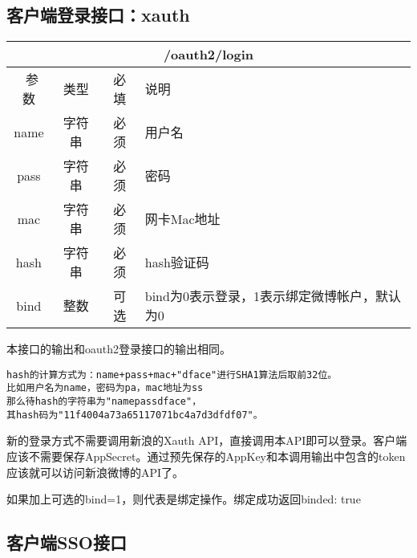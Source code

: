 \documentclass[cs4size]{ctexartutf8}
\begin{document}
\subsection{客户端登录接口：xauth}
\label{hash_algorithm}

\begin{table}[H]
   \begin{center}
\begin{tabular}{|c|c|c|p{12cm}|}
\hline
\multicolumn{4}{|c|}{/oauth2/login} \\
\hline\hline
 \  参数  & 类型 & 必填 &  说明  \\
\hline
 name  & 字符串 & 必须 &  用户名\\
 \hline
 pass  & 字符串 & 必须 &  密码\\
  \hline
 mac  & 字符串 & 必须 &  网卡Mac地址\\
 \hline
 hash  & 字符串 & 必须 &  hash验证码\\
\hline
 bind  & 整数 & 可选 &  bind为0表示登录，1表示绑定微博帐户，默认为0\\
\hline
\end{tabular}
   \end{center}
\end{table}

本接口的输出和oauth2登录接口的输出相同。

\begin{verbatim}
hash的计算方式为：name+pass+mac+"dface"进行SHA1算法后取前32位。
比如用户名为name，密码为pa，mac地址为ss
那么待hash的字符串为"namepassdface"，
其hash码为"11f4004a73a65117071bc4a7d3dfdf07"。
\end{verbatim}

新的登录方式不需要调用新浪的Xauth API，直接调用本API即可以登录。客户端应该不需要保存AppSecret。通过预先保存的AppKey和本调用输出中包含的token应该就可以访问新浪微博的API了。

如果加上可选的bind=1，则代表是绑定操作。绑定成功返回{binded: true}



\subsection{客户端SSO接口}
\label{hash_algorithm}
\end{document}
